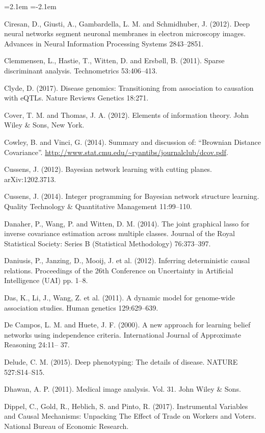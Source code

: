 \begin{list}{}{\leftmargin=2.1em  
  \itemindent=-2.1em \parsep=0pt \itemsep=2pt \topsep=0pt}
\item Ciresan, D., Giusti, A., Gambardella, L. M. and Schmidhuber, J. (2012). Deep neural networks segment neuronal membranes in electron microscopy images. Advances in Neural Information Processing Systems 2843--2851.
\item Clemmensen, L., Hastie, T., Witten, D. and Ersbøll, B. (2011). Sparse discriminant analysis. Technometrics 53:406--413.
\item Clyde, D. (2017). Disease genomics: Transitioning from association to causation with eQTLs. Nature Reviews Genetics 18:271.
\item Cover, T. M. and Thomas, J. A. (2012). Elements of information theory. John Wiley \& Sons, New York.
\item Cowley, B. and Vinci, G. (2014). Summary and discussion of: ``Brownian Distance Covariance''. \url{http://www.stat.cmu.edu/~ryantibs/journalclub/dcov.pdf}.
\item Cussens, J. (2012). Bayesian network learning with cutting planes. arXiv:1202.3713.
\item Cussens, J. (2014). Integer programming for Bayesian network structure learning. Quality Technology \& Quantitative Management 11:99--110.
\item Danaher, P., Wang, P. and Witten, D. M. (2014). The joint graphical lasso for inverse covariance estimation across multiple classes. Journal of the Royal Statistical Society: Series B (Statistical Methodology) 76:373--397.
\item Daniusis, P., Janzing, D., Mooij, J. et al. (2012). Inferring deterministic causal relations. Proceedings of the 26th Conference on Uncertainty in Artificial Intelligence (UAI) pp. 1--8.
\item Das, K., Li, J., Wang, Z. et al. (2011). A dynamic model for genome-wide association studies. Human genetics 129:629--639.
\item De Campos, L. M. and Huete, J. F. (2000). A new approach for learning belief networks using independence criteria. International Journal of Approximate Reasoning 24:11-- 37.
\item Delude, C. M. (2015). Deep phenotyping: The details of disease. NATURE 527:S14--S15.
\item Dhawan, A. P. (2011). Medical image analysis. Vol. 31. John Wiley \& Sons.
\item Dippel, C., Gold, R., Heblich, S. and Pinto, R. (2017). Instrumental Variables and Causal Mechanisms: Unpacking The Effect of Trade on Workers and Voters. National Bureau of Economic Research.

\end{list}
